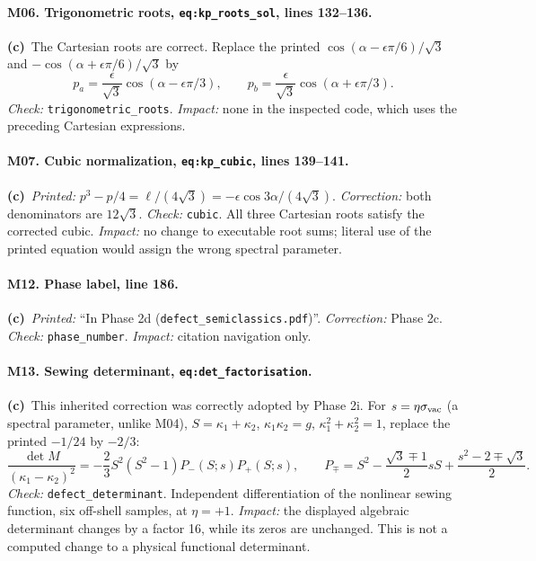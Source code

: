 \documentclass[11pt,a4paper]{article}
\newcommand{\C}{\textbf{(c)}\ }
\newcommand{\file}[1]{\nolinkurl{#1}}
\newcommand{\test}[1]{\textit{Check:} \file{#1}.}
\begin{document}
\paragraph{M06. Trigonometric roots, \file{eq:kp_roots_sol}, lines 132--136.}
\C The Cartesian roots are correct. Replace the printed
$\cos(\alpha-\epsilon\pi/6)/\sqrt3$ and
$-\cos(\alpha+\epsilon\pi/6)/\sqrt3$ by
\[
 p_a=\frac{\epsilon}{\sqrt3}\cos(\alpha-\epsilon\pi/3),\qquad
 p_b=\frac{\epsilon}{\sqrt3}\cos(\alpha+\epsilon\pi/3).
\]
\test{trigonometric_roots} \textit{Impact:} none in the inspected code,
which uses the preceding Cartesian expressions.

\paragraph{M07. Cubic normalization, \file{eq:kp_cubic}, lines 139--141.}
\C \textit{Printed:} $p^3-p/4=\ell/(4\sqrt3)
=-\epsilon\cos3\alpha/(4\sqrt3)$.
\textit{Correction:} both denominators are $12\sqrt3$.
\test{cubic} All three Cartesian roots satisfy the corrected cubic.
\textit{Impact:} no change to executable root sums; literal use of the
printed equation would assign the wrong spectral parameter.

\paragraph{M12. Phase label, line 186.}
\C \textit{Printed:} ``In Phase 2d (\file{defect_semiclassics.pdf})''.
\textit{Correction:} Phase 2c. \test{phase_number}
\textit{Impact:} citation navigation only.


\paragraph{M13. Sewing determinant, \file{eq:det_factorisation}.}
\C This inherited correction was correctly adopted by Phase 2i.
For $s=\eta\sigma_{\rm vac}$ (a spectral parameter, unlike M04),
$S=\kappa_1+\kappa_2$, $\kappa_1\kappa_2=g$,
$\kappa_1^2+\kappa_2^2=1$, replace the printed $-1/24$ by $-2/3$:
\[
 \frac{\det M}{(\kappa_1-\kappa_2)^2}
 =-\frac23 S^2(S^2-1)P_-(S;s)P_+(S;s),\qquad
 P_\mp=S^2-\frac{\sqrt3\mp1}{2}sS+\frac{s^2-2\mp\sqrt3}{2}.
\]
\test{defect_determinant} Independent differentiation of the nonlinear
sewing function, six off-shell samples, at $\eta=+1$.
\textit{Impact:} the displayed algebraic determinant changes by a factor
16, while its zeros are unchanged. This is not a computed change to a
physical functional determinant.
\end{document}

